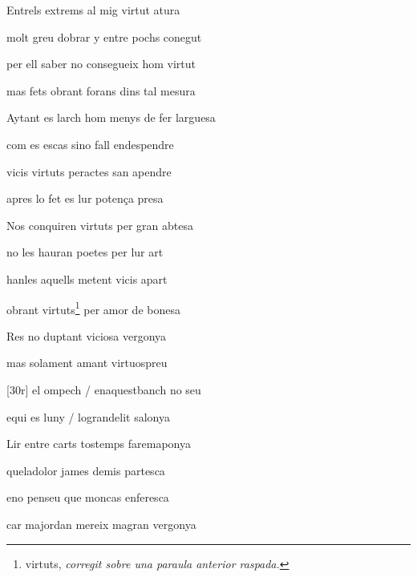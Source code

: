 \documentclass[12pt]{article}
\begin{document}
\begin{estrofa}

 Entrels extrems al mig virtut atura

 molt greu dobrar y entre pochs conegut

 per ell saber no consegueix hom virtut

 mas fets obrant forans dins tal mesura

 Aytant es larch hom menys de fer larguesa

 com es escas sino fall endespendre

 vicis virtuts peractes san apendre

 apres lo fet es lur poten\c{c}a presa

\end{estrofa}



\begin{estrofa}

 Nos conquiren virtuts per gran abtesa

 no les hauran poetes per lur art

 hanles aquells metent vicis apart

 obrant virtuts\footnote{virtuts, \textit{corregit sobre una paraula anterior
raspada.}} per amor de bonesa

 Res no duptant viciosa vergonya

 mas solament amant virtuospreu

 [30r] el ompech / enaquestbanch no seu

 equi es luny / lograndelit salonya

\end{estrofa}



\begin{estrofa}

 Lir entre carts tostemps faremaponya

 queladolor james demis partesca

 eno penseu que moncas enferesca

 car majordan mereix magran vergonya

\end{estrofa}
\end{document}
